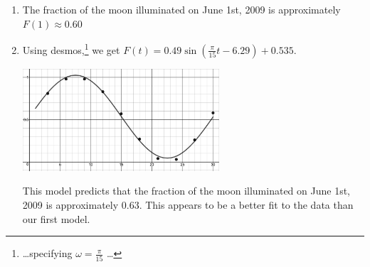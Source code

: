 \documentclass{ximera}
\begin{document}
\begin{enumerate}
\begin{enumerate}
\begin{center}
\end{center}


\item  The fraction of the moon illuminated on June 1st, 2009 is approximately $F(1) \approx 0.60$


\item  Using desmos,\footnote{\ldots specifying $\omega = \frac{\pi}{15}$ \ldots} we get $F(t) = 0.49\sin \left(\frac{\pi }{15}t-6.29\right)+0.535$.

\begin{center}

 \includegraphics[height=1.5in]{./GraphsofSineandCosineGraphics/MoonIlluminatonDesmos.jpg} 

\end{center}

This model predicts that the fraction of the moon illuminated on June 1st, 2009 is approximately $0.63$.  This appears to be a better fit to the data than our first model.

\end{enumerate}


\end{enumerate}
\end{document}
